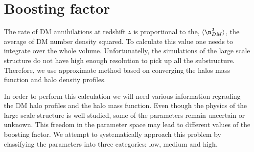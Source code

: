 \section{Boosting factor}
\label{sec:boosting}

The rate of DM annihilations at redshift $z$ is proportional to the, $\langle \n_{DM}^2 \rangle$, the average of DM number density squared. To calculate this value one needs to integrate over the whole volume. Unfortunatelly, the simulations of the large scale structure do not have high enough resolution to pick up all the substructure. Therefore, we use approximate method based on converging the halos mass function and halo density profiles.

In order to perform this calculation we will need various information regrading the DM halo profiles and the halo mass function. Even though the physics of the large scale structure is well studied, some of the parameters remain uncertain or unknown. This freedom in the parameter space may lead to different values of the boosting factor. We attempt to systematically approach this problem by classifying the parameters into three categories: low, medium and high.